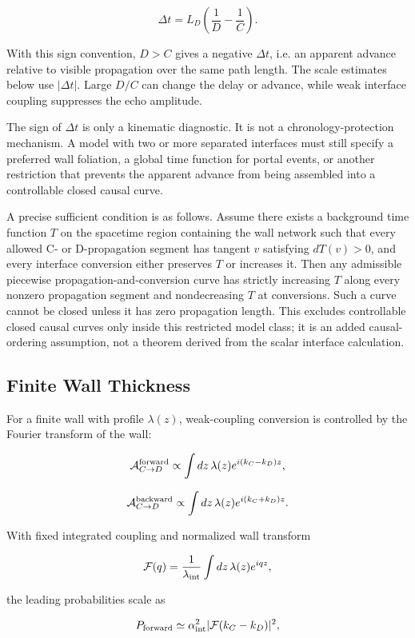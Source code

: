 \documentclass[11pt]{article}
\begin{document}
\[
\Delta t=L_D\left(\frac{1}{D}-\frac{1}{C}\right).
\]


With this sign convention, \(D>C\) gives a negative \(\Delta t\), i.e. an apparent advance relative to visible propagation over the same path length. The scale estimates below use \(|\Delta t|\). Large \(D/C\) can change the delay or advance, while weak interface coupling suppresses the echo amplitude.


The sign of \(\Delta t\) is only a kinematic diagnostic. It is not a chronology-protection mechanism. A model with two or more separated interfaces must still specify a preferred wall foliation, a global time function for portal events, or another restriction that prevents the apparent advance from being assembled into a controllable closed causal curve.


A precise sufficient condition is as follows. Assume there exists a background time function \(T\) on the spacetime region containing the wall network such that every allowed C- or D-propagation segment has tangent \(v\) satisfying \(dT(v)>0\), and every interface conversion either preserves \(T\) or increases it. Then any admissible piecewise propagation-and-conversion curve has strictly increasing \(T\) along every nonzero propagation segment and nondecreasing \(T\) at conversions. Such a curve cannot be closed unless it has zero propagation length. This excludes controllable closed causal curves only inside this restricted model class; it is an added causal-ordering assumption, not a theorem derived from the scalar interface calculation.


\subsection{Finite Wall Thickness}


For a finite wall with profile \(\lambda(z)\), weak-coupling conversion is controlled by the Fourier transform of the wall:


\[
{\cal A}_{C\to D}^{\rm forward}\propto
\int dz\,\lambda(z)e^{i(k_C-k_D)z},
\]


\[
{\cal A}_{C\to D}^{\rm backward}\propto
\int dz\,\lambda(z)e^{i(k_C+k_D)z}.
\]


With fixed integrated coupling and normalized wall transform


\[
{\cal F}(q)=
\frac{1}{\lambda_{\rm int}}
\int dz\,\lambda(z)e^{iqz},
\]


the leading probabilities scale as


\[
P_{\rm forward}\simeq
\alpha_{\rm int}^2|{\cal F}(k_C-k_D)|^2,
\]
\end{document}
